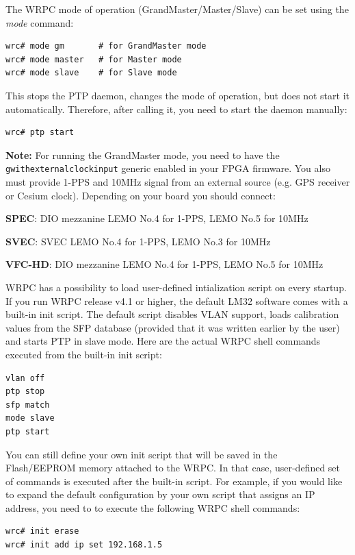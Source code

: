 \documentclass[a4paper, 12pt]{article}
\renewcommand{\_}{\underscore\allowbreak}
\begin{document}
The WRPC  mode of operation (GrandMaster/Master/Slave) can be set
using the \textit{mode} command:

\begin{lstlisting}
wrc# mode gm       # for GrandMaster mode
wrc# mode master   # for Master mode
wrc# mode slave    # for Slave mode
\end{lstlisting}

This stops the PTP daemon, changes the mode of operation, but does not start it
automatically. Therefore, after calling it, you need to start the daemon
manually:

\begin{lstlisting}
wrc# ptp start
\end{lstlisting}

\noindent\textbf{Note:} For running the GrandMaster mode, you need to have the
\texttt{g\_with\_external\_clock\_input} generic enabled in your FPGA firmware.
You also must provide 1-PPS and 10MHz signal from an external source (e.g. GPS receiver or
Cesium clock). Depending on your board you should connect:
\begin{itemize*}
  \item \textbf{SPEC}: DIO mezzanine LEMO No.4 for 1-PPS, LEMO No.5 for 10MHz
  \item \textbf{SVEC}: SVEC LEMO No.4 for 1-PPS, LEMO No.3 for 10MHz
  \item \textbf{VFC-HD}: DIO mezzanine LEMO No.4 for 1-PPS, LEMO No.5 for 10MHz
\end{itemize*}

\vspace{1em}
WRPC has a possibility to load user-defined intialization script on every
startup. If you run WRPC release v4.1 or higher, the default LM32 software
comes with a built-in init script. The default script disables VLAN support,
loads calibration values from the SFP database (provided that it was written
earlier by the user) and starts PTP in slave mode. Here are the actual WRPC
shell commands executed from the built-in init script:
\begin{lstlisting}
vlan off
ptp stop
sfp match
mode slave
ptp start
\end{lstlisting}

You can still define your own init script that will be saved in the
Flash/EEPROM memory attached to the WRPC. In that case, user-defined set of
commands is executed after the built-in script. For example, if you would
like to expand the default configuration by your own script that assigns an IP
address, you need to to execute the following WRPC shell commands:
\begin{lstlisting}
wrc# init erase
wrc# init add ip set 192.168.1.5
\end{lstlisting}
\end{document}

